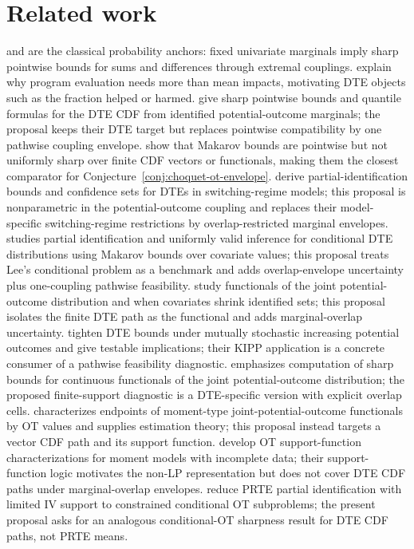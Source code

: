\documentclass[11pt]{article}
\theoremstyle{definition}
\theoremstyle{plain}
\theoremstyle{remark}
\begin{document}
\section{Related work}
\citet{Makarov1981} and \citet{Rueschendorf1982} are the classical probability anchors:
fixed univariate marginals imply sharp pointwise bounds for sums and differences through
extremal couplings.  \citet{HeckmanSmithClements1997} explain why program evaluation
needs more than mean impacts, motivating DTE objects such as the fraction helped or
harmed.  \citet[Section 2 and Lemma 2.3]{FanPark2010} give sharp pointwise bounds and
quantile formulas for the DTE CDF from identified potential-outcome marginals; the
proposal keeps their DTE target but replaces pointwise compatibility by one pathwise
coupling envelope.  \citet[Section 2]{FirpoRidder2019} show that Makarov bounds are
pointwise but not uniformly sharp over finite CDF vectors or functionals, making them
the closest comparator for Conjecture~\ref{conj:choquet-ot-envelope}.  \citet[Sections
2--3]{FanWu2010} derive partial-identification bounds and confidence sets for DTEs in
switching-regime models; this proposal is nonparametric in the potential-outcome
coupling and replaces their model-specific switching-regime restrictions by
overlap-restricted marginal envelopes.  \citet[Sections 2--3]{Lee2024}
studies partial identification and uniformly valid inference for conditional DTE
distributions using Makarov bounds over covariate values; this proposal treats Lee's
conditional problem as a benchmark and adds overlap-envelope uncertainty plus
one-coupling pathwise feasibility.  \citet[Sections 2--3]{FanGuerreZhu2017} study functionals of the
joint potential-outcome distribution and when covariates shrink identified sets; this
proposal isolates the finite DTE path as the functional and adds marginal-overlap
uncertainty.  \citet{FrandsenLefgren2021}
tighten DTE bounds under mutually stochastic increasing potential outcomes and give
testable implications; their KIPP application is a concrete consumer of a pathwise
feasibility diagnostic.  \citet[Supplementary Appendix 3]{Russell2021} emphasizes
computation of sharp bounds for continuous functionals of the joint potential-outcome
distribution; the proposed finite-support diagnostic is a DTE-specific version with
explicit overlap cells.  \citet[Sections 2--3]{OberReynolds2023} characterizes
endpoints of moment-type joint-potential-outcome
functionals by OT values and supplies estimation theory; this proposal instead targets
a vector CDF path and its support function.  \citet{FanPassShi2025} develop OT
support-function characterizations for moment models with incomplete data; their
support-function logic motivates the non-LP representation but does not cover DTE CDF
paths under marginal-overlap envelopes.  \citet{TanBlanchetSyrgkanis2026} reduce
PRTE partial identification with limited IV support to constrained conditional OT
subproblems; the present proposal asks for an analogous conditional-OT sharpness result
for DTE CDF paths, not PRTE means.
\end{document}
